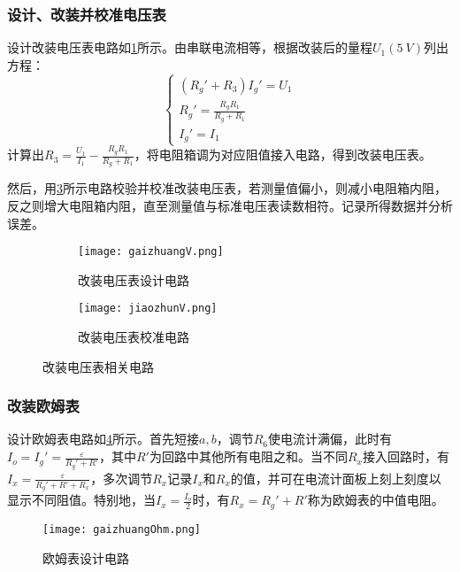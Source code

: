 \documentclass[]{../template/Report}
\begin{document}
\subsubsection{设计、改装并校准电压表}
    设计改装电压表电路如\cref{gaizhuangV}所示。由串联电流相等，根据改装后的量程$U_1 (\SI{5}{V})$列出方程：
    \begin{equation}
        \begin{cases}
            (R_g'+R_3)I_g' = U_1\\
            R_g' = \frac{R_g R_1}{R_g + R_1} \\
            I_g' = I_1 
        \end{cases}
    \end{equation}
    计算出$R_3=\frac{U_1}{I_1} - \frac{R_g R_1}{R_g + R_1}$，将电阻箱调为对应阻值接入电路，得到改装电压表。

    然后，用\cref{jiaozhunV}所示电路校验并校准改装电压表，若测量值偏小，则减小电阻箱内阻，反之则增大电阻箱内阻，直至测量值与标准电压表读数相符。记录所得数据并分析误差。
    \begin{figure}[htbp]
        \centering
        \begin{subfigure}[b]{0.45\textwidth}
            \texttt{[image: gaizhuangV.png]}
            \caption{改装电压表设计电路}
            \label{gaizhuangV}
        \end{subfigure}
        \hfill
        \begin{subfigure}[b]{0.45\textwidth}
            \texttt{[image: jiaozhunV.png]}
            \caption{改装电压表校准电路}
            \label{jiaozhunV}
        \end{subfigure}
        \caption{改装电压表相关电路}
    \end{figure}

\subsubsection{改装欧姆表}
    设计欧姆表电路如\cref{gaizhuangOhm}所示。首先短接$a,b$，调节$R_6$使电流计满偏，此时有$I_o = I_g' = \frac{\varepsilon}{R_g'+R'}$，其中$R'$为回路中其他所有电阻之和。当不同$R_x$接入回路时，有$I_x = \frac{\varepsilon}{R_g'+R'+R_x}$，多次调节$R_x$记录$I_x$和$R_x$的值，并可在电流计面板上刻上刻度以显示不同阻值。特别地，当$I_x=\frac{I_o}{2}$时，有$R_x = R_g' + R'$称为欧姆表的中值电阻。
    \begin{figure}[htbp]
        \centering
        \texttt{[image: gaizhuangOhm.png]}
        \caption{欧姆表设计电路}
        \label{gaizhuangOhm}
    \end{figure}
\end{document}

